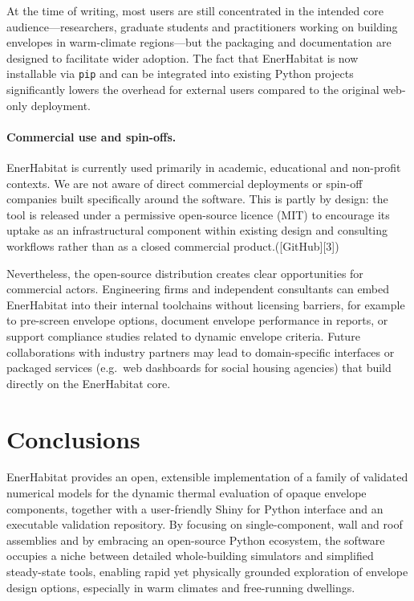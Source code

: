 \documentclass[preprint,12pt, a4paper]{elsarticle}
\begin{document}
At the time of writing, most users are still concentrated in the intended core audience—researchers, graduate students and practitioners working on building envelopes in warm-climate regions—but the packaging and documentation are designed to facilitate wider adoption. The fact that EnerHabitat is now installable via \texttt{pip} and can be integrated into existing Python projects significantly lowers the overhead for external users compared to the original web-only deployment.

\paragraph{Commercial use and spin-offs.}

EnerHabitat is currently used primarily in academic, educational and non-profit contexts. We are not aware of direct commercial deployments or spin-off companies built specifically around the software. This is partly by design: the tool is released under a permissive open-source licence (MIT) to encourage its uptake as an infrastructural component within existing design and consulting workflows rather than as a closed commercial product.([GitHub][3])

Nevertheless, the open-source distribution creates clear opportunities for commercial actors. Engineering firms and independent consultants can embed EnerHabitat into their internal toolchains without licensing barriers, for example to pre-screen envelope options, document envelope performance in reports, or support compliance studies related to dynamic envelope criteria. Future collaborations with industry partners may lead to domain-specific interfaces or packaged services (e.g.\ web dashboards for social housing agencies) that build directly on the EnerHabitat core.

\section{Conclusions}

EnerHabitat provides an open, extensible implementation of a family of validated numerical models for the dynamic thermal evaluation of opaque envelope components, together with a user-friendly Shiny for Python interface and an executable validation repository. By focusing on single-component, wall and roof assemblies and by embracing an open-source Python ecosystem, the software occupies a niche between detailed whole-building simulators and simplified steady-state tools, enabling rapid yet physically grounded exploration of envelope design options, especially in warm climates and free-running dwellings.
\end{document}
